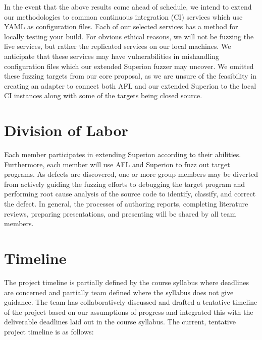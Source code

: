\documentclass[12pt]{diazessay}
\begin{document}
In the event that the above results come ahead of schedule, we intend to extend our methodologies to common continuous integration (CI\cite{cicd}) services\cite{trevisci}\cite{circleci}\cite{jeninks} which use YAML as configuration files.
Each of our selected services has a method for locally testing your build.
For obvious ethical reasons, we will not be fuzzing the live services, but rather the replicated services on our local machines.
We anticipate that these services may have vulnerabilities in mishandling configuration files which our extended Superion fuzzer may uncover.
We omitted these fuzzing targets from our core proposal, as we are unsure of the feasibility in creating an adapter to connect both AFL and our extended Superion to the local CI instances along with some of the targets being closed source.


\section*{Division of Labor}

Each member participates in extending Superion according to their abilities.
Furthermore, each member will use AFL and Superion to fuzz out target programs.
As defects are discovered, one or more group members may be diverted from actively guiding the fuzzing efforts to debugging the target program and performing root cause analysis of the source code to identify, classify, and correct the defect.
In general, the processes of authoring reports, completing literature reviews, preparing presentations, and presenting will be shared by all team members.


\section*{Timeline}

The project timeline is partially defined by the course syllabus where deadlines are concerned and partially team defined where the syllabus does not give guidance.
The team has collaboratively discussed and drafted a tentative timeline of the project based on our assumptions of progress and integrated this with the deliverable deadlines laid out in the course syllabus. The current, tentative project timeline is as follows:
\end{document}
